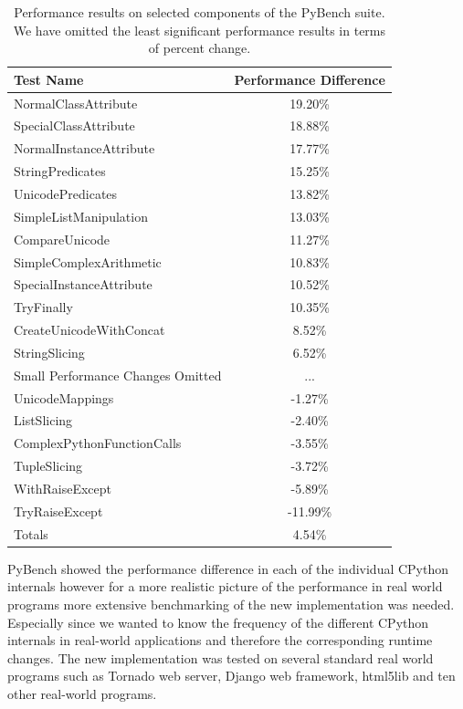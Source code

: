 \documentclass[11pt]{article}
\begin{document}
\begin{table}
\centering
  \caption{Performance results on selected components of the PyBench suite.  We
    have omitted the least significant performance results in terms of percent
    change.
  }
\begin{tabular}{| l | c |}
  \hline
  \textbf{Test Name} & \textbf{Performance Difference} \\ \hline
  NormalClassAttribute &  19.20\% \\ \hline
  SpecialClassAttribute &  18.88\% \\ \hline
  NormalInstanceAttribute &  17.77\% \\ \hline
  StringPredicates &  15.25\% \\ \hline
  UnicodePredicates &  13.82\% \\ \hline
  SimpleListManipulation &  13.03\% \\ \hline
  CompareUnicode &  11.27\% \\ \hline
  SimpleComplexArithmetic &  10.83\% \\ \hline
  SpecialInstanceAttribute &  10.52\% \\ \hline
  TryFinally &  10.35\% \\ \hline
  CreateUnicodeWithConcat &  8.52\% \\ \hline
  StringSlicing &  6.52\% \\ \hline
  Small Performance Changes Omitted & ... \\ \hline
  UnicodeMappings &  -1.27\% \\ \hline
  ListSlicing &  -2.40\% \\ \hline
  ComplexPythonFunctionCalls &  -3.55\% \\ \hline
  TupleSlicing &  -3.72\% \\ \hline
  WithRaiseExcept &  -5.89\% \\ \hline
  TryRaiseExcept &  -11.99\% \\ \hline
  Totals & 4.54\% \\ \hline
\end{tabular}
\label{pybenchtable}
\end{table}

PyBench showed the performance difference in each of the individual CPython
internals however for a more realistic picture of the performance in real world
programs more extensive benchmarking of the new implementation was needed.
Especially since we wanted to know the frequency of the different CPython
internals in real-world applications and therefore the corresponding runtime
changes. The new implementation was tested on several standard real world
programs such as Tornado web server, Django web framework, html5lib and ten other real-world programs. 
\end{document}
